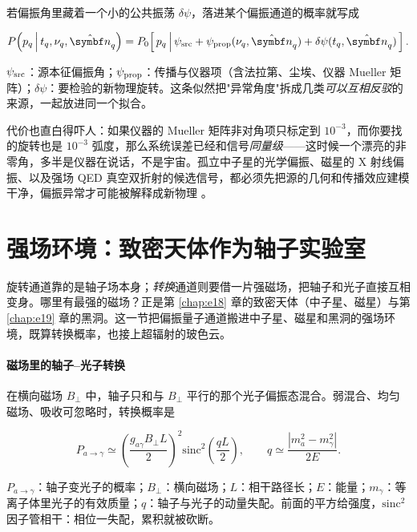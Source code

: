若偏振角里藏着一个小的公共振荡 \(\delta\psi\)，落进某个偏振通道的概率就写成

\begin{equation}
  P\!\left(p_q\,\middle|\,t_q,\nu_q,\hat{\bm n}_q\right)
  = P_0\!\left[\,p_q\,\middle|\,\psi_{\rm src}
     +\psi_{\rm prop}(\nu_q,\hat{\bm n}_q)+\delta\psi(t_q,\hat{\bm n}_q)\,\right].
  \label{eq:e22-likelihood}
\end{equation}
\begin{formulaexplain}
\(\psi_{\rm src}\)：源本征偏振角；\(\psi_{\rm prop}\)：传播与仪器项（含法拉第、尘埃、仪器 Mueller 矩阵）；\(\delta\psi\)：要检验的新物理旋转。这条似然把"异常角度"拆成几类\emph{可以互相反驳}的来源，一起放进同一个拟合。
\end{formulaexplain}

代价也直白得吓人：如果仪器的 Mueller 矩阵非对角项只标定到 \(10^{-3}\)，而你要找的旋转也是 \(10^{-3}\) 弧度，那么系统误差已经和信号\emph{同量级}——这时候一个漂亮的非零角，多半是仪器在说话，不是宇宙。孤立中子星的光学偏振、磁星的 X 射线偏振、以及强场 QED 真空双折射的候选信号，都必须先把源的几何和传播效应建模干净，偏振异常才可能被解释成新物理 \citep{2017MNRAS.465..492M}。


\section{强场环境：致密天体作为轴子实验室}
\label{sec:e22-strongfield}

旋转通道靠的是轴子场本身；\emph{转换}通道则要借一片强磁场，把轴子和光子直接互相变身。哪里有最强的磁场？正是第 \ref{chap:e18} 章的致密天体（中子星、磁星）与第 \ref{chap:e19} 章的黑洞。这一节把偏振量子通道搬进中子星、磁星和黑洞的强场环境，既算转换概率，也接上超辐射的玻色云。

\paragraph{磁场里的轴子--光子转换}

在横向磁场 \(B_\perp\) 中，轴子只和与 \(B_\perp\) 平行的那个光子偏振态混合。弱混合、均匀磁场、吸收可忽略时，转换概率是

\begin{equation}
  P_{a\to\gamma}\simeq\left(\frac{g_{a\gamma}B_\perp L}{2}\right)^2
  \mathrm{sinc}^2\!\left(\frac{qL}{2}\right),
  \qquad
  q\simeq\frac{|m_a^2-m_\gamma^2|}{2E}.
  \label{eq:e22-conversion}
\end{equation}
\begin{formulaexplain}
\(P_{a\to\gamma}\)：轴子变光子的概率；\(B_\perp\)：横向磁场；\(L\)：相干路径长；\(E\)：能量；\(m_\gamma\)：等离子体里光子的有效质量；\(q\)：轴子与光子的动量失配。前面的平方给强度，\(\mathrm{sinc}^2\) 因子管相干：相位一失配，累积就被砍断。
\end{formulaexplain}

